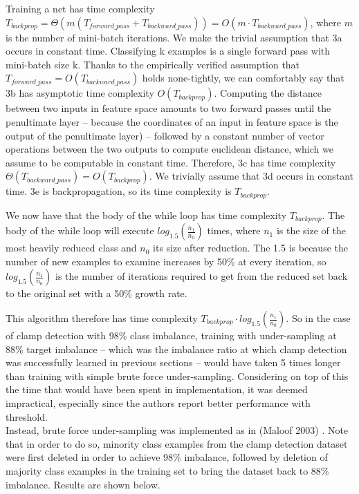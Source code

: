 \documentclass[a4paper,11pt]{article}
\begin{document}
Training a net has time complexity $T_{backprop} = \Theta(m (T_{forward\_pass}+T_{backward\_pass})) = O(m \cdot T_{backward\_pass})$, where $m$ is the number of mini-batch iterations. We make the trivial assumption that 3a occurs in constant time. Classifying k examples is a single forward pass with mini-batch size k. Thanks to the empirically verified \cite{soumith-benchmark} assumption that $T_{forward\_pass} = O(T_{backward\_pass})$ holds none-tightly, we can comfortably say that 3b has asymptotic time complexity $O(T_{backprop})$. Computing the distance between two inputs in feature space amounts to two forward passes until the penultimate layer -- because the coordinates of an input in feature space is the output of the penultimate layer) -- followed by a constant number of vector operations between the two outputs to compute euclidean distance, which we assume to be computable in constant time. Therefore, 3c has time complexity $\Theta(T_{backward\_pass}) = O(T_{backprop})$. We trivially assume that 3d occurs in constant time. 3e is backpropagation, so its time complexity is $T_{backprop}$.

We now have that the body of the while loop has time complexity $T_{backprop}$. The body of the while loop will execute $log_{1.5}(\frac{n_1}{n_0})$ times, where $n_1$ is the size of the most heavily reduced class and $n_0$ its size after reduction. The 1.5 is because the number of new examples to examine increases by 50\% at every iteration, so $log_{1.5}(\frac{n_1}{n_0})$ is the number of iterations required to get from the reduced set back to the original set with a 50\% growth rate.

This algorithm therefore has time complexity $T_{backprop}\cdot log_{1.5}(\frac{n_1}{n_0})$. So in the case of clamp detection with 98\% class imbalance, training with under-sampling at 88\% target imbalance -- which was the imbalance ratio at which clamp detection was successfully learned in previous sections -- would have taken 5 times longer than training with simple brute force under-sampling. Considering on top of this the time that would have been spent in implementation, it was deemed impractical, especially since the authors report better performance with threshold. \\

Instead, brute force under-sampling was implemented as in (Maloof 2003) \cite{maloof}. Note that in order to do so, minority class examples from the clamp detection dataset were first deleted in order to achieve 98\% imbalance, followed by deletion of majority class examples in the training set to bring the dataset back to 88\% imbalance. Results are shown below.
\end{document}
